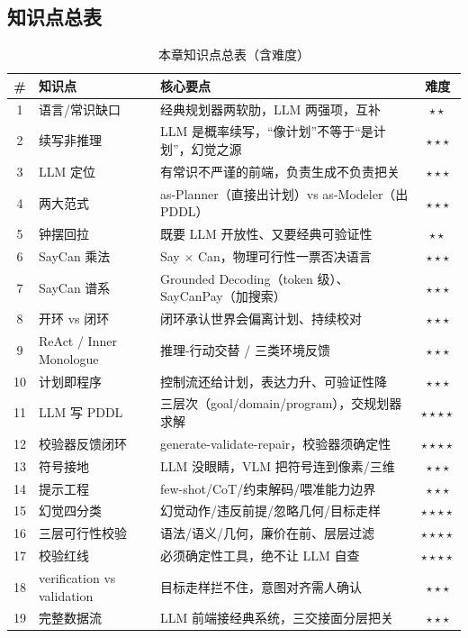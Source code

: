 \subsection*{知识点总表}

\begin{table}[H]\centering\small
\caption{本章知识点总表（含难度）}
\label{tab:llm-knowledge}
\begin{tabular}{clp{6.4cm}c}
\toprule
\# & 知识点 & 核心要点 & 难度 \\
\midrule
1 & 语言/常识缺口 & 经典规划器两软肋，LLM 两强项，互补 & $\star\star$ \\
2 & 续写非推理 & LLM 是概率续写，“像计划”不等于“是计划”，幻觉之源 & $\star\star\star$ \\
3 & LLM 定位 & 有常识不严谨的前端，负责生成不负责把关 & $\star\star\star$ \\
4 & 两大范式 & as-Planner（直接出计划）vs as-Modeler（出 PDDL） & $\star\star\star$ \\
5 & 钟摆回拉 & 既要 LLM 开放性、又要经典可验证性 & $\star\star$ \\
6 & SayCan 乘法 & Say $\times$ Can，物理可行性一票否决语言 & $\star\star\star$ \\
7 & SayCan 谱系 & Grounded Decoding（token 级）、SayCanPay（加搜索） & $\star\star\star$ \\
8 & 开环 vs 闭环 & 闭环承认世界会偏离计划、持续校对 & $\star\star\star$ \\
9 & ReAct / Inner Monologue & 推理-行动交替 / 三类环境反馈 & $\star\star\star$ \\
10 & 计划即程序 & 控制流还给计划，表达力升、可验证性降 & $\star\star\star$ \\
11 & LLM 写 PDDL & 三层次（goal/domain/program），交规划器求解 & $\star\star\star\star$ \\
12 & 校验器反馈闭环 & generate-validate-repair，校验器须确定性 & $\star\star\star\star$ \\
13 & 符号接地 & LLM 没眼睛，VLM 把符号连到像素/三维 & $\star\star\star$ \\
14 & 提示工程 & few-shot/CoT/约束解码/喂准能力边界 & $\star\star\star$ \\
15 & 幻觉四分类 & 幻觉动作/违反前提/忽略几何/目标走样 & $\star\star\star\star$ \\
16 & 三层可行性校验 & 语法/语义/几何，廉价在前、层层过滤 & $\star\star\star\star$ \\
17 & 校验红线 & 必须确定性工具，绝不让 LLM 自查 & $\star\star\star\star$ \\
18 & verification vs validation & 目标走样拦不住，意图对齐需人确认 & $\star\star\star$ \\
19 & 完整数据流 & LLM 前端接经典系统，三交接面分层把关 & $\star\star\star$ \\
\bottomrule
\end{tabular}
\end{table}

